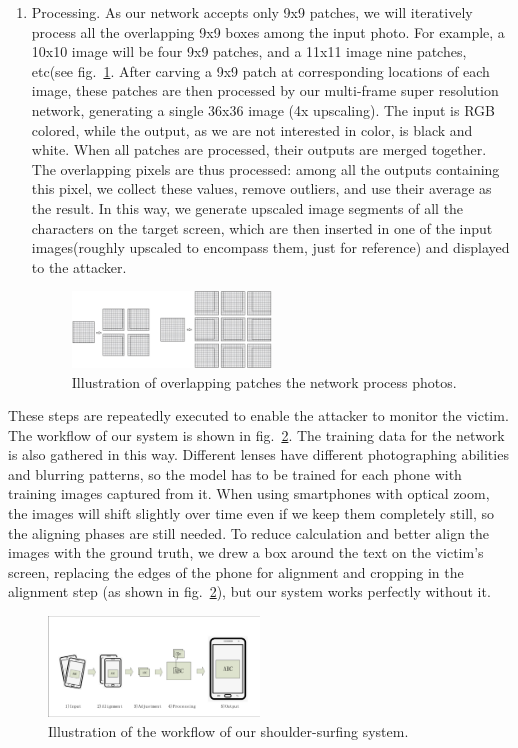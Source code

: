 \begin{enumerate}
\item Processing. As our network accepts only 9x9 patches, we will iteratively process all the overlapping 9x9 boxes among the input photo. For example, a 10x10 image will be four 9x9 patches, and a 11x11 image nine patches, etc(see fig.~\ref{fig-patches}. After carving a 9x9 patch at corresponding locations of each image, these patches are then processed by our multi-frame super resolution network, generating a single 36x36 image (4x upscaling). The input is RGB colored, while the output, as we are not interested in color, is black and white. When all patches are processed, their outputs are merged together. The overlapping pixels are thus processed: among all the outputs containing this pixel, we collect these values, remove outliers, and use their average as the result. In this way, we generate upscaled image segments of all the characters on the target screen, which are then inserted in one of the input images(roughly upscaled to encompass them, just for reference) and displayed to the attacker.

\begin{figure}
 \centering
    \includegraphics[width=0.5\textwidth]{./pic/patches.jpg}
    \caption{Illustration of overlapping patches the network process photos.}
    \label{fig-patches}
\end{figure}

\end{enumerate}

These steps are repeatedly executed to enable the attacker to monitor the victim. The workflow of our system is shown in fig.~\ref{fig-workflow}. The training data for the network is also gathered in this way. Different lenses have different photographing abilities and blurring patterns, so the model has to be trained for each phone with training images captured from it. When using smartphones with optical zoom, the images will shift slightly over time even if we keep them completely still, so the aligning phases are still needed. To reduce calculation and better align the images with the ground truth, we drew a box around the text on the victim's screen, replacing the edges of the phone for alignment and cropping in the alignment step (as shown in fig.~\ref{fig-workflow}), but our system works perfectly without it.
\begin{figure}
 \centering
    \includegraphics[width=0.5\textwidth]{./pic/workflow.pdf}
    \caption{Illustration of the workflow of our shoulder-surfing system.}
    \label{fig-workflow}
\end{figure}

